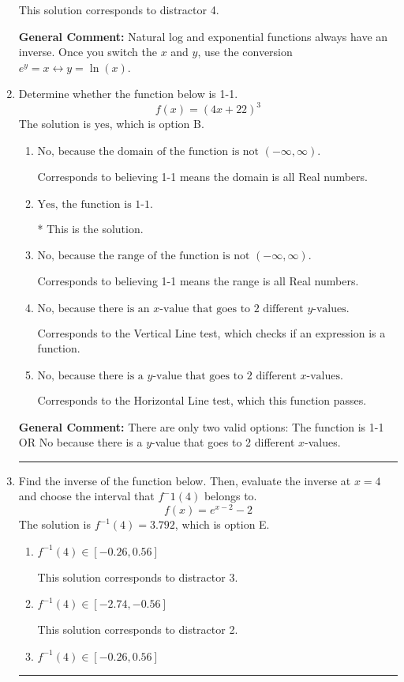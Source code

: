 \documentclass{extbook}[14pt]
\newcommand{\litem}[1]{\item #1

\rule{\textwidth}{0.4pt}}
\begin{document}
\begin{enumerate}
{\begin{enumerate}[label=\Alph*.]
 This solution corresponds to distractor 4.
\end{enumerate}

\textbf{General Comment:} Natural log and exponential functions always have an inverse. Once you switch the $x$ and $y$, use the conversion $ e^y = x \leftrightarrow y=\ln(x)$.
}
\litem{
Determine whether the function below is 1-1.
\[ f(x) = (4 x + 22)^3 \]The solution is \( \text{yes} \), which is option B.\begin{enumerate}[label=\Alph*.]
\item \( \text{No, because the domain of the function is not $(-\infty, \infty)$.} \)

Corresponds to believing 1-1 means the domain is all Real numbers.
\item \( \text{Yes, the function is 1-1.} \)

* This is the solution.
\item \( \text{No, because the range of the function is not $(-\infty, \infty)$.} \)

Corresponds to believing 1-1 means the range is all Real numbers.
\item \( \text{No, because there is an $x$-value that goes to 2 different $y$-values.} \)

Corresponds to the Vertical Line test, which checks if an expression is a function.
\item \( \text{No, because there is a $y$-value that goes to 2 different $x$-values.} \)

Corresponds to the Horizontal Line test, which this function passes.
\end{enumerate}

\textbf{General Comment:} There are only two valid options: The function is 1-1 OR No because there is a $y$-value that goes to 2 different $x$-values.
}
\litem{
Find the inverse of the function below. Then, evaluate the inverse at $x = 4$ and choose the interval that $f^-1(4)$ belongs to.
\[ f(x) = e^{x-2}-2 \]The solution is \( f^{-1}(4) = 3.792 \), which is option E.\begin{enumerate}[label=\Alph*.]
\item \( f^{-1}(4) \in [-0.26, 0.56] \)

 This solution corresponds to distractor 3.
\item \( f^{-1}(4) \in [-2.74, -0.56] \)

 This solution corresponds to distractor 2.
\item \( f^{-1}(4) \in [-0.26, 0.56] \)


\end{enumerate}}
\end{enumerate}
\end{document}
